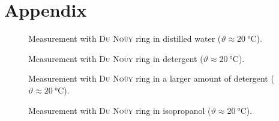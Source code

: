 \chapter{Appendix}
    \begin{figure}[h]
        \centering
        
        \caption[Measurement with \textsc{Du Noüy} ring in distilled water (\(\vartheta \approx \SI{20}{\celsius}\))]{Measurement with \textsc{Du Noüy} ring in distilled water (\(\vartheta \approx \SI{20}{\celsius}\)).}
        \label{fig:Du_Nouy_Method_Measurement_with_distilled_water_No_1}
    \end{figure}
    \begin{figure}[h]
        \centering
        
        \caption[Measurement with \textsc{Du Noüy} ring in detergent (\(\vartheta \approx \SI{20}{\celsius}\))]{Measurement with \textsc{Du Noüy} ring in detergent (\(\vartheta \approx \SI{20}{\celsius}\)).}
        \label{fig:Du_Nouy_Method_Measurement_with_detergent_No_1}
    \end{figure}
    \begin{figure}[h]
        \centering
        
        \caption[Measurement with \textsc{Du Noüy} ring in a larger amount of detergent (\(\vartheta \approx \SI{20}{\celsius}\))]{Measurement with \textsc{Du Noüy} ring in a larger amount of detergent (\(\vartheta \approx \SI{20}{\celsius}\)).}
        \label{fig:Du_Nouy_Method_Measurement_with_more_detergent_No_1}
    \end{figure}
    \begin{figure}[h]
        \centering
        
        \caption[Measurement with \textsc{Du Noüy} ring in isopropanol (\(\vartheta \approx \SI{20}{\celsius}\))]{Measurement with \textsc{Du Noüy} ring in isopropanol (\(\vartheta \approx \SI{20}{\celsius}\)).}
        \label{fig:Du_Nouy_Method_Measurement_with_isopropanol_No_1}
    \end{figure}
